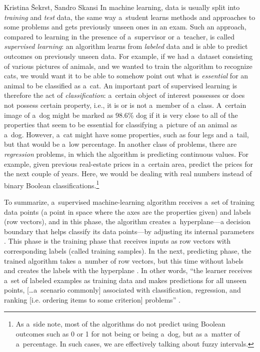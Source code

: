 \begin{artengenv2auth}{Kristina Šekrst, Sandro Skansi}
In machine learning, data is usually split into \textit{training} and \textit{test} data, the same way a~student learns methods and approaches to some problems and gets previously unseen ones in an exam. Such an approach, compared to learning in the presence of a~supervisor or a~teacher, is called \textit{supervised learning}: an algorithm learns from \textit{labeled} data and is able to predict outcomes on previously unseen data. For example, if we had a~dataset consisting of various pictures of animals, and we wanted to train the algorithm to recognize cats, we would want it to be able to somehow point out what is \textit{essential} for an animal to be classified as a~cat. An important part of supervised learning is therefore the act of \textit{classification}: a~certain object of interest possesses or does not possess certain property, i.e., it is or is not a~member of a~class. A~certain image of a~dog might be marked as 98.6\% dog if it is very close to all of the properties that seem to be essential for classifying a~picture of an animal as a~dog. However, a~cat might have some properties, such as four legs and a~tail, but that would be a~low percentage. In another class of problems, there are \textit{regression} problems, in which the algorithm is predicting continuous values. For example, given previous real-estate prices in a~certain area, predict the prices for the next couple of years. Here, we would be dealing with real numbers instead of binary Boolean classifications.\footnote{As a~side note, most of the algorithms do not predict using Boolean outcomes such as 0 or 1 for not being or being a~dog, but as a~matter of a~percentage. In such cases, we are effectively talking about fuzzy intervals.}

To summarize, a~supervised machine-learning algorithm receives a~set of training data points (a point in space where the axes are the properties given) and labels (row vectors), and in this phase, the algorithm creates a~hyperplane—a decision boundary that helps classify its data points—by adjusting its internal parameters
\parencite[][pp.55–56]{skansi_introduction_2018}. %
 This phase is the training phase that receives inputs as row vectors with corresponding labels (called training samples). In the next, predicting phase, the trained algorithm takes a~number of row vectors, but this time without labels and creates the labels with the hyperplane 
\parencite[][p.56]{skansi_introduction_2018}. %
 In other words, ``the learner receives a~set of labeled examples as training data and makes predictions for all unseen points, [\ldots a~scenario commonly] associated with classification, regression, and ranking [i.e. ordering items to some criterion] problems'' 
\parencite[][p.6]{mohri_foundations_2018}.%



\end{artengenv2auth}
